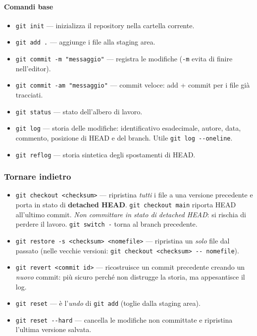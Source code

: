 \documentclass[a4paper,12pt]{article}
\begin{document}
\paragraph{Comandi base}
\begin{itemize}
  \item \verb|git init| --- inizializza il repository nella cartella corrente.
  \item \verb|git add .| --- aggiunge i file alla staging area.
  \item \verb|git commit -m "messaggio"| --- registra le modifiche
        (\verb|-m| evita di finire nell'editor).
  \item \verb|git commit -am "messaggio"| --- commit veloce: add + commit per i file già
        tracciati.
  \item \verb|git status| --- stato dell'albero di lavoro.
  \item \verb|git log| --- storia delle modifiche: identificativo esadecimale, autore,
        data, commento, posizione di HEAD e del branch. Utile \verb|git log --oneline|.
  \item \verb|git reflog| --- storia sintetica degli spostamenti di HEAD.
\end{itemize}

\subsubsection{Tornare indietro}

\begin{itemize}
  \item \verb|git checkout <checksum>| --- ripristina \emph{tutti} i file a una versione
        precedente e porta in stato di \textbf{detached HEAD}.
        \verb|git checkout main| riporta HEAD all'ultimo commit.
        \emph{Non committare in stato di detached HEAD}: si rischia di perdere il lavoro.
        \verb|git switch -| torna al branch precedente.
  \item \verb|git restore -s <checksum> <nomefile>| --- ripristina un \emph{solo} file
        dal passato (nelle vecchie versioni: \verb|git checkout <checksum> -- nomefile|).
  \item \verb|git revert <commit id>| --- ricostruisce un commit precedente creando un
        \emph{nuovo} commit: più sicuro perché non distrugge la storia, ma appesantisce
        il log.
  \item \verb|git reset| --- è l'\emph{undo} di \verb|git add| (toglie dalla staging
        area).
  \item \verb|git reset --hard| --- cancella le modifiche non committate e ripristina
        l'ultima versione salvata.
\end{itemize}
\end{document}
